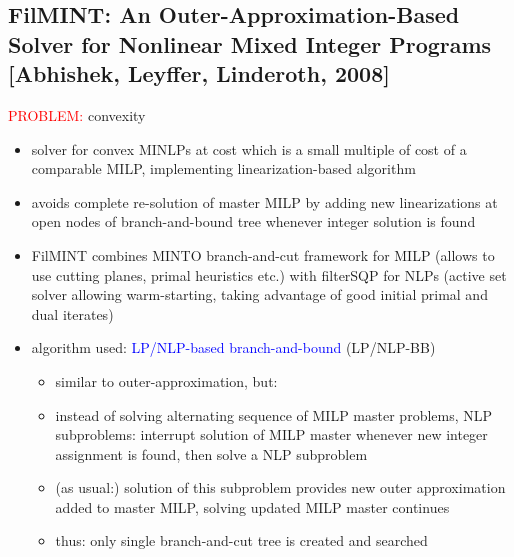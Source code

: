 \documentclass{article}
\begin{document}
\subsection{FilMINT: An Outer-Approximation-Based Solver for Nonlinear Mixed Integer Programs [Abhishek, Leyffer, Linderoth, 2008]}
\textcolor{red}{PROBLEM:} convexity
\begin{itemize}
\item solver for convex MINLPs at cost which is a small multiple of cost of a comparable MILP, implementing linearization-based algorithm
\item avoids complete re-solution of master MILP by adding new linearizations at open nodes of branch-and-bound tree whenever integer solution is found
\item FilMINT combines MINTO branch-and-cut framework for MILP (allows to use cutting planes, primal heuristics etc.)  with filterSQP for NLPs (active set solver allowing warm-starting, taking advantage of good initial primal and dual iterates)
\item algorithm used: \textcolor{blue}{LP/NLP-based branch-and-bound} (LP/NLP-BB) \cite{quesada1992lp}
\begin{itemize}
\item similar to outer-approximation, but:
\item instead of solving alternating sequence of MILP master problems, NLP subproblems: interrupt solution of MILP master whenever new integer assignment is found, then solve a NLP subproblem
\item (as usual:) solution of this subproblem provides new outer approximation added to master MILP, solving updated MILP master continues
\item thus: only single branch-and-cut tree is created and searched
\end{itemize}
\end{itemize}
\end{document}
